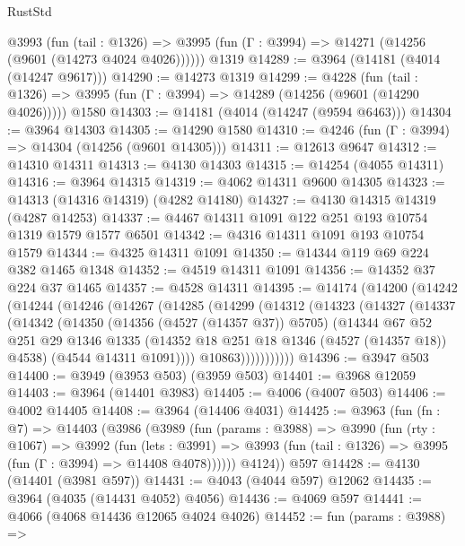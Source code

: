 \begin{lexlean}{RustStd}
\begin{coremodule}
{\begin{coremodule}
{{{{{{{{{{{{{{{{{{{{{{{{{{{{{{{{{{{{{{    @3993
      (fun (tail : @1326) =>
      @3995 (fun (Γ : @3994) => @14271 (@14256 (@9601 (@14273 @4024 @4026))))))
    @1319
@14289 := @3964 (@14181 (@4014 (@14247 @9617)))
@14290 := @14273 @1319
@14299 := @4228
    (fun (tail : @1326) => @3995 (fun (Γ : @3994) => @14289 (@14256 (@9601 (@14290 @4026)))))
    @1580
@14303 := @14181 (@4014 (@14247 (@9594 @6463)))
@14304 := @3964 @14303
@14305 := @14290 @1580
@14310 := @4246 (fun (Γ : @3994) => @14304 (@14256 (@9601 @14305)))
@14311 := @12613 @9647
@14312 := @14310 @14311
@14313 := @4130 @14303
@14315 := @14254 (@4055 @14311)
@14316 := @3964 @14315
@14319 := @4062 @14311 @9600 @14305
@14323 := @14313 (@14316 @14319) (@4282 @14180)
@14327 := @4130 @14315 @14319 (@4287 @14253)
@14337 := @4467 @14311 @1091 @122 @251 @193 @10754 @1319 @1579 @1577 @6501
@14342 := @4316 @14311 @1091 @193 @10754 @1579
@14344 := @4325 @14311 @1091
@14350 := @14344 @119 @69 @224 @382 @1465 @1348
@14352 := @4519 @14311 @1091
@14356 := @14352 @37 @224 @37 @1465
@14357 := @4528 @14311
@14395 := @14174
    (@14200
      (@14242
        (@14244
          (@14246
            (@14267
              (@14285
                (@14299
                  (@14312
                    (@14323
                      (@14327
                        (@14337
                          (@14342
                            (@14350
                              (@14356 (@4527 (@14357 @37)) @5705)
                              (@14344
                                @67
                                @52
                                @251
                                @29
                                @1346
                                @1335
                                (@14352 @18 @251 @18 @1346 (@4527 (@14357 @18)) @4538)
                                (@4544 @14311 @1091))))
                          @10863)))))))))))
@14396 := @3947 @503
@14400 := @3949 (@3953 @503) (@3959 @503)
@14401 := @3968 @12059
@14403 := @3964 (@14401 @3983)
@14405 := @4006 (@4007 @503)
@14406 := @4002 @14405
@14408 := @3964 (@14406 @4031)
@14425 := @3963
    (fun (fn : @7) =>
    @14403
      (@3986
        (@3989
          (fun (params : @3988) =>
          @3990
            (fun (rty : @1067) =>
            @3992
              (fun (lets : @3991) =>
              @3993 (fun (tail : @1326) => @3995 (fun (Γ : @3994) => @14408 @4078))))))
        @4124))
    @597
@14428 := @4130 (@14401 (@3981 @597))
@14431 := @4043 (@4044 @597) @12062
@14435 := @3964 (@4035 (@14431 @4052) @4056)
@14436 := @4069 @597
@14441 := @4066 (@4068 @14436 @12065 @4024 @4026)
@14452 := fun (params : @3988) =>
}}}}}}}}}}}}}}}}}}}}}}}}}}}}}}}}}}}}}}
\end{coremodule}}
\end{coremodule}
\end{lexlean}
